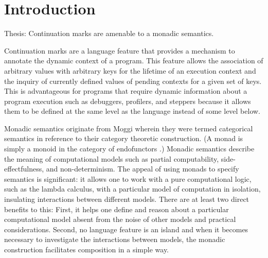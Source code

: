 \documentclass[ms]{byuprop}
\title{\Title}
\author{\Author}
\newcounter{example}
\begin{document}
\maketitle



\section{Introduction}


Thesis: Continuation marks are amenable to a monadic semantics.


Continuation marks \cite{clements2006portable} are a language feature that provides a
mechanism to annotate the dynamic context of a program. This feature allows the
association of arbitrary values with arbitrary keys for the lifetime of an execution
context and the inquiry of currently defined values of pending contexts for a given set of
keys. This is advantageous for programs that require dynamic information about a program
execution such as debuggers, profilers, and steppers because it allows them to be defined
at the same level as the language instead of some level below.



Monadic semantics originate from Moggi \cite{moggi1989computational} wherein they were
termed categorical semantics in reference to their category theoretic construction. (A
monad is simply a monoid in the category of endofunctors \cite{mac1998categories}.) Monadic semantics describe the
meaning of computational models such as partial computability, side-effectfulness, and
non-determinism. The appeal of using monads to specify semantics is significant: it allows
one to work with a pure computational logic, such as the lambda calculus, with a
particular model of computation in isolation, insulating interactions between
different models. There are at least two direct benefits to this: First, it helps one
define and reason about a particular computational model absent from the noise of other
models and practical considerations. Second, no language feature is an island and when it
becomes necessary to investigate the interactions between models, the monadic construction
facilitates composition in a simple way.
\end{document}
